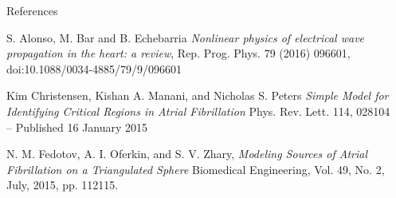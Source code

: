 \documentclass[final,hyperref={pdfpagelabels=false}]{beamer}
\begin{document}
\begin{frame}[t]
\begin{columns}[t]
\begin{column}{.465\textwidth}
\begin{block}{References}
\begin{thebibliography}{1}
S. Alonso, M. Bar and B. Echebarria
\emph{Nonlinear physics of electrical wave
propagation in the heart: a review},
Rep. Prog. Phys. 79 (2016) 096601, 
doi:10.1088/0034-4885/79/9/096601

Kim Christensen, Kishan A. Manani, and Nicholas S. Peters
\emph{Simple Model for Identifying Critical Regions in Atrial Fibrillation}
Phys. Rev. Lett. 114, 028104 – Published 16 January 2015



N. M. Fedotov,  A. I. Oferkin, and S. V. Zhary,
\emph{Modeling Sources of Atrial Fibrillation on a Triangulated Sphere}
Biomedical Engineering, Vol. 49, No. 2, July, 2015, pp. 112115. 
\end{thebibliography}

\end{block}









\end{column} %

\begin{column}{.015\textwidth}\end{column} %

\end{columns} %

\end{frame} %
\end{document}

